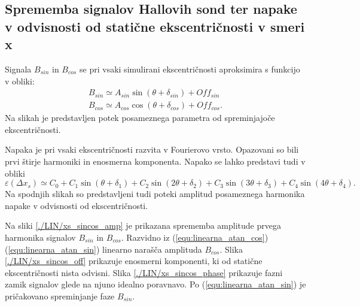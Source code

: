 \subsection{Sprememba signalov Hallovih sond ter napake v odvisnosti od statične ekscentričnosti v smeri x}
Signala $B_{sin}$ in $B_{cos}$ se pri vsaki simulirani ekscentričnosti aproksimira s funkcijo v obliki:
\begin{eqnarray}
B_{sin} \simeq A_{sin} \sin (\theta + \delta_{sin})+ Off_{sin}\\
B_{cos} \simeq A_{cos} \cos (\theta + \delta_{cos})+ Off_{cos}.
\end{eqnarray}
Na slikah je predstavljen potek posameznega parametra od spreminjajoče ekscentričnosti.

Napaka je pri vsaki ekscentričnosti razvita v Fourierovo vrsto. Opazovani so bili prvi štirje harmoniki in enosmerna komponenta. Napako se lahko predstavi tudi v obliki
\begin{equation}
\varepsilon (\Delta x_s) \simeq C_0 + C_1 \sin (\theta + \delta_1)
+ C_2 \sin (2 \theta + \delta_2)
+ C_3 \sin (3 \theta + \delta_3)
+ C_4 \sin (4 \theta + \delta_4).
\end{equation}
Na spodnjih slikah so predstavljeni tudi poteki amplitud posameznega harmonika napake v odvisnosti od ekscentričnosti.

Na sliki \ref{./LIN/xs_sincos_amp} je prikazana sprememba amplitude prvega harmonika signalov $B_{sin}$ in $B_{cos}$. Razvidno iz (\ref{equ:linearna_atan_cos})  (\ref{equ:linearna_atan_sin}) linearno narašča amplituda $B_{cos}$. Slika \ref{./LIN/xs_sincos_off} prikazuje enosmerni komponenti, ki od statične ekscentričnosti nista odvisni. Slika \ref{./LIN/xs_sincos_phase} prikazuje fazni zamik signalov glede na njuno idealno poravnavo. Po (\ref{equ:linearna_atan_sin}) je pričakovano spreminjanje faze $B_{sin}$.

